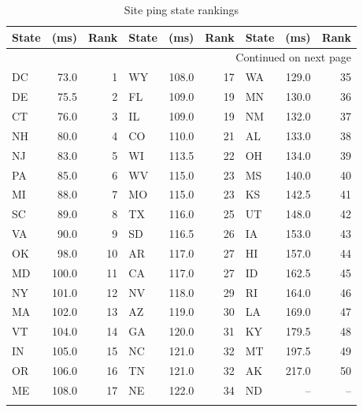 \begin{longtable}{lrr|lrr|lrr}
\toprule
\textbf{State} & \textbf{(ms)} & \textbf{Rank} & \textbf{State} & \textbf{(ms)} & \textbf{Rank} & \textbf{State} & \textbf{(ms)} & \textbf{Rank} \\
\midrule
\endhead
\midrule
\multicolumn{9}{r}{{Continued on next page}} \\
\midrule
\endfoot

\bottomrule
\endlastfoot
DC    &    73.0 &     1     &  WY    &   108.0 &    17 &     WA    &   129.0 &    35 \\
DE    &    75.5 &     2     &  FL    &   109.0 &    19 &     MN    &   130.0 &    36 \\
CT    &    76.0 &     3     &  IL    &   109.0 &    19 &     NM    &   132.0 &    37 \\
NH    &    80.0 &     4     &  CO    &   110.0 &    21 &     AL    &   133.0 &    38 \\
NJ    &    83.0 &     5     &  WI    &   113.5 &    22 &     OH    &   134.0 &    39 \\
PA    &    85.0 &     6     &  WV    &   115.0 &    23 &     MS    &   140.0 &    40 \\
MI    &    88.0 &     7     &  MO    &   115.0 &    23 &     KS    &   142.5 &    41 \\
SC    &    89.0 &     8     &  TX    &   116.0 &    25 &     UT    &   148.0 &    42 \\
VA    &    90.0 &     9     &  SD    &   116.5 &    26 &     IA    &   153.0 &    43 \\
OK    &    98.0 &    10     &  AR    &   117.0 &    27 &     HI    &   157.0 &    44 \\
MD    &   100.0 &    11     &  CA    &   117.0 &    27 &     ID    &   162.5 &    45 \\
NY    &   101.0 &    12     &  NV    &   118.0 &    29 &     RI    &   164.0 &    46 \\
MA    &   102.0 &    13     &  AZ    &   119.0 &    30 &     LA    &   169.0 &    47 \\
VT    &   104.0 &    14     &  GA    &   120.0 &    31 &     KY    &   179.5 &    48 \\
IN    &   105.0 &    15     &  NC    &   121.0 &    32 &     MT    &   197.5 &    49 \\
OR    &   106.0 &    16     &  TN    &   121.0 &    32 &     AK    &   217.0 &    50 \\
ME    &   108.0 &    17     &  NE    &   122.0 &    34 &     ND    &      -- &    -- \\
        \caption{Site ping state rankings}
        \label{tab:site_ping_state_rankings}
\end{longtable}
